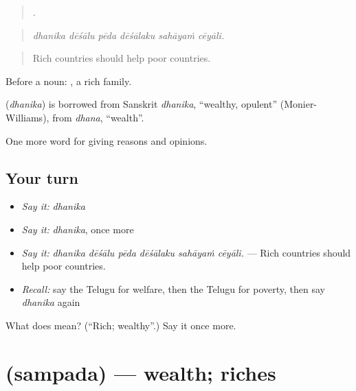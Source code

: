 \begin{quote}
     .
\end{quote}

\begin{quote}
\emph{dhanika dēśālu pēda dēśālaku sahāyaṁ cēyāli.}
\end{quote}

\begin{quote}
Rich countries should help poor countries.
\end{quote}

Before a noun:  , a rich family.

\begin{cousinweb}
\textbf{} (\emph{dhanika}) is borrowed from Sanskrit \emph{dhanika}, \textquotedblleft{}wealthy, opulent\textquotedblright{} (Monier-Williams), from \emph{dhana}, \textquotedblleft{}wealth\textquotedblright{}.
\end{cousinweb}

\begin{grammarlens}[title={What you've built}]
One more word for giving reasons and opinions.
\end{grammarlens}

\subsection*{Your turn}
\begin{itemize}
\raggedright
  \item \emph{Say it:} \emph{dhanika}
  \item \emph{Say it:} \emph{dhanika}, once more
  \item \emph{Say it:} \emph{dhanika dēśālu pēda dēśālaku sahāyaṁ cēyāli.} — Rich countries should help poor countries.
  \item \emph{Recall:} say the Telugu for welfare, then the Telugu for poverty, then say \emph{dhanika} again
\end{itemize}

\begin{tcolorbox}[breakable,colback=teal!4,colframe=teal!35!black,title={Before you move on}]
What does  mean? (\textquotedblleft{}Rich; wealthy\textquotedblright{}.) Say it once more.
\end{tcolorbox}
\section[\texorpdfstring{\te{సంపద} (sampada)}{సంపద (sampada)}]{ (sampada) — wealth; riches}

